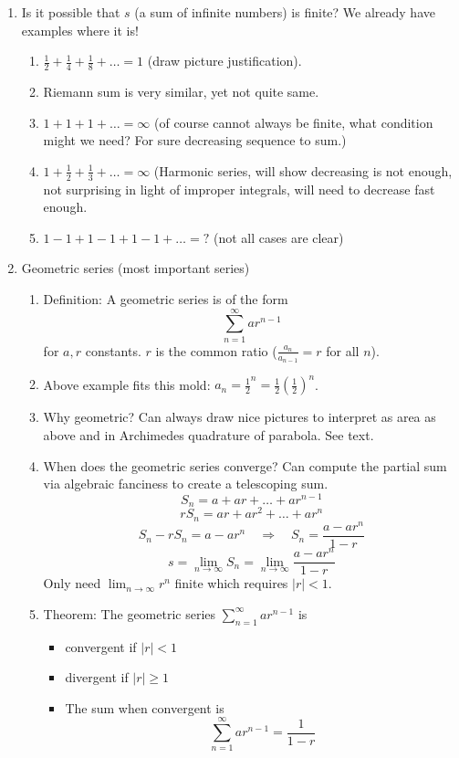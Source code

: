 \documentclass{article}
\newcommand{\ds}{\displaystyle}
\begin{document}
\begin{enumerate}
\item Is it possible that $s$ (a sum of infinite numbers) is finite? We already have examples where it is!
\begin{enumerate}
\item $\frac{1}{2} +\frac{1}{4} +\frac{1}{8} + \dots = 1$ (draw picture justification).
\item Riemann sum is very similar, yet not quite same.
\item $1 + 1 + 1 + \dots = \infty$ (of course cannot always be finite, what condition might we need? For sure decreasing sequence to sum.)
\item $1 + \frac{1}{2} + \frac{1}{3} + \dots = \infty$ (Harmonic series, will show decreasing is not enough, not surprising in light of improper integrals, will need to decrease fast enough.
\item $1-1+1-1+1-1+\dots = ?$ (not all cases are clear) 
\end{enumerate}

\item Geometric series (most important series)
\begin{enumerate}

\item Definition: A geometric series is of the form
\[
\sum_{n=1}^{\infty} a r^{n-1}
\]
for $a,r$ constants. $r$ is the common ratio ($\ds \frac{a_n}{a_{n-1}}=r$ for all $n$).
\item Above example fits this mold: $a_n=\frac{1}{2}^n = \frac{1}{2} \left(\frac{1}{2}\right)^n$.
\item Why geometric? Can always draw nice pictures to interpret as area as above and in Archimedes quadrature of parabola. See text.

\item When does the geometric series converge? Can compute the partial sum via algebraic fanciness to create a telescoping sum.
\[
S_n = a + ar + \dots + ar^{n-1}
\]
\[
rS_n = ar + ar^2 + \dots + ar^{n}
\]
\[
S_n-rS_n = a - ar^n \quad \Rightarrow \quad S_n = \frac{a-ar^n}{1-r}
\]
\[
s = \lim_{n\rightarrow \infty} S_n = \lim_{n\rightarrow \infty} \frac{a-ar^n}{1-r}
\]
Only need $\ds \lim_{n\rightarrow \infty} r^n$ finite which requires $|r|<1$.

\item Theorem: The geometric series $\ds \sum_{n=1}^{\infty} a r^{n-1}$ is
\begin{itemize}
\item convergent if $|r|<1$
\item  divergent if $|r|\geq 1$
\item The sum when convergent is 
\[
\sum_{n=1}^{\infty} a r^{n-1} = \frac{1}{1-r}
\]
\end{itemize}


\end{enumerate}
\end{enumerate}
\end{document}
